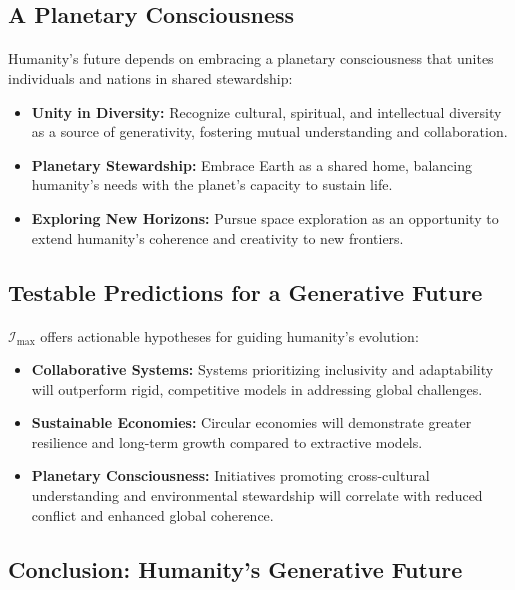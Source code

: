 \documentclass[12pt]{article}
\begin{document}
\subsection{A Planetary Consciousness}
\paragraph{}
Humanity’s future depends on embracing a planetary consciousness that unites individuals and nations in shared stewardship:
\begin{itemize}
    \item \textbf{Unity in Diversity:} Recognize cultural, spiritual, and intellectual diversity as a source of generativity, fostering mutual understanding and collaboration.
    \item \textbf{Planetary Stewardship:} Embrace Earth as a shared home, balancing humanity’s needs with the planet’s capacity to sustain life.
    \item \textbf{Exploring New Horizons:} Pursue space exploration as an opportunity to extend humanity’s coherence and creativity to new frontiers.
\end{itemize}

\subsection{Testable Predictions for a Generative Future}
\paragraph{}
\(\mathcal{I}_{\text{max}}\) offers actionable hypotheses for guiding humanity’s evolution:
\begin{itemize}
    \item \textbf{Collaborative Systems:} Systems prioritizing inclusivity and adaptability will outperform rigid, competitive models in addressing global challenges.
    \item \textbf{Sustainable Economies:} Circular economies will demonstrate greater resilience and long-term growth compared to extractive models.
    \item \textbf{Planetary Consciousness:} Initiatives promoting cross-cultural understanding and environmental stewardship will correlate with reduced conflict and enhanced global coherence.
\end{itemize}

\subsection{Conclusion: Humanity’s Generative Future}
\end{document}
